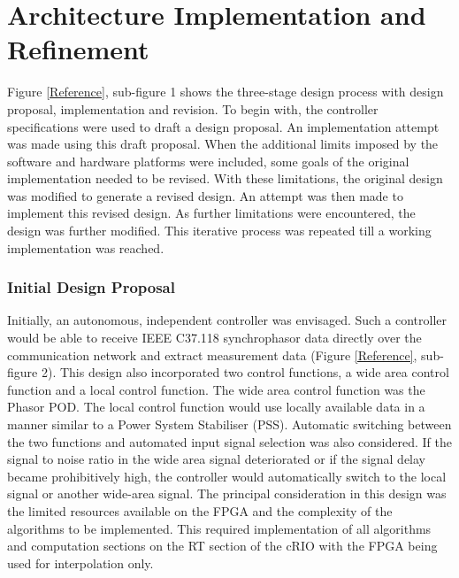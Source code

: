 \documentclass[conference]{IEEEtran}
\begin{document}
\section{Architecture Implementation and Refinement}
Figure \ref{Reference}, sub-figure 1 shows the three-stage design process with design proposal, implementation and revision. To begin with, the controller specifications were used to draft a design proposal. An implementation attempt was made using this draft proposal. When the additional limits imposed by the software and hardware platforms were included, some goals of the original implementation needed to be revised. With these limitations, the original design was modified to generate a revised design. An attempt was then made to implement this revised design. As further limitations were encountered, the design was further modified. This iterative process was repeated till a working implementation was reached.

\subsubsection{Initial Design Proposal}
Initially, an autonomous, independent controller was envisaged. Such a controller would be able to receive IEEE C37.118 synchrophasor data directly over the communication network and extract measurement data (Figure \ref{Reference}, sub-figure 2). This design also incorporated two control functions, a wide area control function and a local control function. The wide area control function was the Phasor POD\cite{PhasorPOD}. The local control function would use locally available data in a manner similar to a Power System Stabiliser (PSS). Automatic switching between the two functions and automated input signal selection was also considered. If the signal to noise ratio in the wide area signal deteriorated or if the signal delay became prohibitively high, the controller would automatically switch to the local signal or another wide-area signal. The principal consideration in this design was the limited resources available on the FPGA and the complexity of the algorithms to be implemented. This required implementation of all algorithms and computation sections on the RT section of the cRIO with the FPGA being used for interpolation only. %
\end{document}
